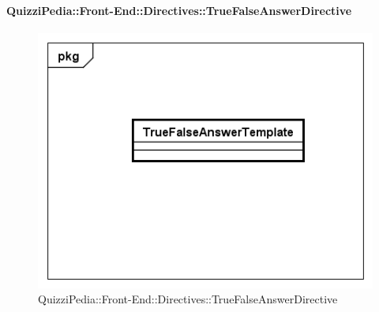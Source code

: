 		\paragraph{QuizziPedia::Front-End::Directives::TrueFalseAnswerDirective}
		
		\label{QuizziPedia::Front-End::Directives::TrueFalseAnswerDirective}
		
		\begin{figure}[ht]
			\centering
			\includegraphics[scale=0.5,keepaspectratio]{UML/Classi/Front-End/QuizziPedia_Front-end_Templates_TrueFalseAnswerTemplate.png}
			\caption{QuizziPedia::Front-End::Directives::TrueFalseAnswerDirective}
		\end{figure} \FloatBarrier
		
